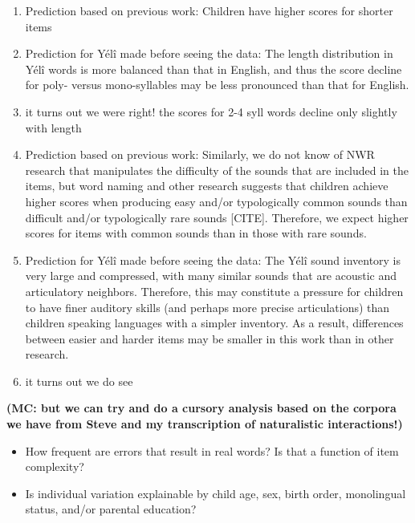 \documentclass[english,,man,floatsintext]{apa6}
\providecommand{\tightlist}{%
  \setlength{\itemsep}{0pt}\setlength{\parskip}{0pt}}
\begin{document}
\begin{enumerate}
\def\labelenumi{\arabic{enumi}.}
\item
  Prediction based on previous work: Children have higher scores for
  shorter items
\item
  Prediction for Yélî made before seeing the data: The length
  distribution in Yélî words is more balanced than that in English, and
  thus the score decline for poly- versus mono-syllables may be less
  pronounced than that for English.
\item
  it turns out we were right! the scores for 2-4 syll words decline only
  slightly with length
\item
  Prediction based on previous work: Similarly, we do not know of NWR
  research that manipulates the difficulty of the sounds that are
  included in the items, but word naming and other research suggests
  that children achieve higher scores when producing easy and/or
  typologically common sounds than difficult and/or typologically rare
  sounds {[}CITE{]}. Therefore, we expect higher scores for items with
  common sounds than in those with rare sounds.
\item
  Prediction for Yélî made before seeing the data: The Yélî sound
  inventory is very large and compressed, with many similar sounds that
  are acoustic and articulatory neighbors. Therefore, this may
  constitute a pressure for children to have finer auditory skills (and
  perhaps more precise articulations) than children speaking languages
  with a simpler inventory. As a result, differences between easier and
  harder items may be smaller in this work than in other research.
\item
  it turns out we do see
\end{enumerate}

\textbf{(MC: but we can try and do a cursory analysis based on the
corpora we have from Steve and my transcription of naturalistic
interactions!)}

\begin{itemize}
\tightlist
\item
  How frequent are errors that result in real words? Is that a function
  of item complexity?
\item
  Is individual variation explainable by child age, sex, birth order,
  monolingual status, and/or parental education?
\end{itemize}
\end{document}
